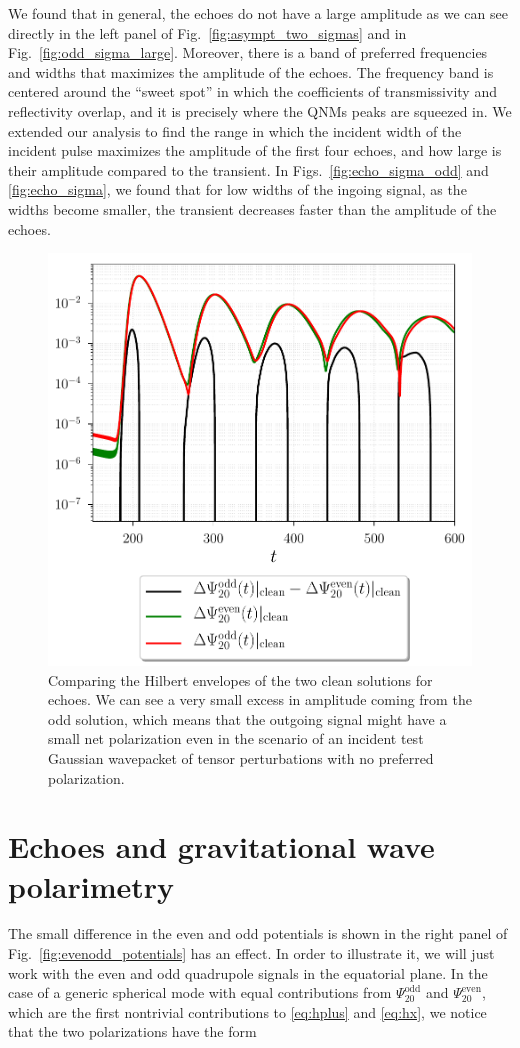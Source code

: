 \documentclass[article,aps,nofootinbib,twocolumn,superscriptaddress]{revtex4-1}
\begin{document}
We found that in general, the echoes do not have a large amplitude as we can see directly in the left panel of Fig.~\ref{fig:asympt_two_sigmas} and in Fig.~\ref{fig:odd_sigma_large}. Moreover, there is a band of preferred frequencies and widths that maximizes the amplitude of the echoes. The frequency band is centered around the ``sweet spot'' in which the coefficients of transmissivity and reflectivity overlap, and it is precisely where the QNMs peaks are squeezed in. We extended our analysis to find the range in which the incident width of the incident pulse maximizes the amplitude of the first four echoes, and how large is their amplitude compared to the transient. In Figs.~\ref{fig:echo_sigma_odd} and \ref{fig:echo_sigma}, we found that for low widths of the ingoing signal, as the widths become smaller, the transient decreases faster than the amplitude of the echoes. 
\begin{figure}[t!]
\centering
\includegraphics[width=.45\textwidth]{figures/Polarimetry_echo_w_06495.pdf}
\caption{\label{fig:pol} Comparing the Hilbert envelopes of the two clean solutions for echoes. We can see a very small excess in amplitude coming from the odd solution, which means that the outgoing signal might have a small net polarization even in the scenario of an incident test Gaussian wavepacket of tensor perturbations with no preferred polarization.}
\end{figure}

\appendix
\section{Echoes and gravitational wave polarimetry}
\label{sec:AppendixPolar}


The small difference in the even and odd potentials is shown in the right panel of Fig.~\ref{fig:evenodd_potentials} has an effect. In order to illustrate it, we will just work with the even and odd quadrupole signals in the equatorial plane. In the case of a generic spherical mode with equal contributions from $\Psi^{\mathrm{odd}}_{20}$ and $\Psi^{\mathrm{even}}_{20} $, which are the first nontrivial contributions to \eqref{eq:hplus} and \eqref{eq:hx}, we notice that the two polarizations have the form 
\end{document}
